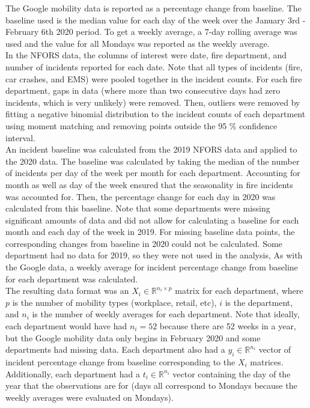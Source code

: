 \documentclass[paper=a4, fontsize=11pt]{scrartcl}
\begin{document}
The Google mobility data is reported as a percentage change from baseline. The baseline used is the median value for each day of the week over the January 3rd - February 6th 2020 period. To get a weekly average, a 7-day rolling average was used and the value for all Mondays was reported as the weekly average. \\

In the NFORS data, the columns of interest were date, fire department, and number of incidents reported for each date. Note that all types of incidents (fire, car crashes, and EMS) were pooled together in the incident counts. For each fire department, gaps in data (where more than two consecutive days had zero incidents, which is very unlikely) were removed. Then, outliers were removed by fitting a negative binomial distribution to the incident counts of each department using moment matching and removing points outside the 95 \% confidence interval.\\


An incident baseline was calculated from the 2019 NFORS data and applied to the 2020 data. The baseline was calculated by taking the median of the number of incidents per day of the week per month for each department. Accounting for month as well as day of the week ensured that the seasonality in fire incidents was accounted for. Then, the percentage change for each day in 2020 was calculated from this baseline. Note that some departments were missing significant amounts of data and did not allow for calculating a baseline for each month and each day of the week in 2019. For missing baseline data points, the corresponding changes from baseline in 2020 could not be calculated.  Some department had no data for 2019, so they were not used in the analysis, As with the Google data, a weekly average for incident percentage change from baseline for each department was calculated. \\

 The resulting data format was an $X_i \in \mathbb{R}^{n_i \times p}$ matrix for each department, where $p$ is the number of mobility types (workplace, retail, etc), $i$ is the department, and $n_i$ is the number of weekly averages for each department. Note that ideally, each department would have had $n_i = 52$ because there are 52 weeks in a year, but the Google mobility data only begins in February 2020 and some departments had missing data. Each department also had a $y_i \in \mathbb{R}^{n_i}$ vector of incident percentage change from baseline corresponding to the $X_i$ matrices. Additionally, each department had a $t_i \in \mathbb{R}^{n_i}$ vector containing the day of the year that the observations are for (days all correspond to Mondays because the weekly averages were evaluated on Mondays).
\end{document}
